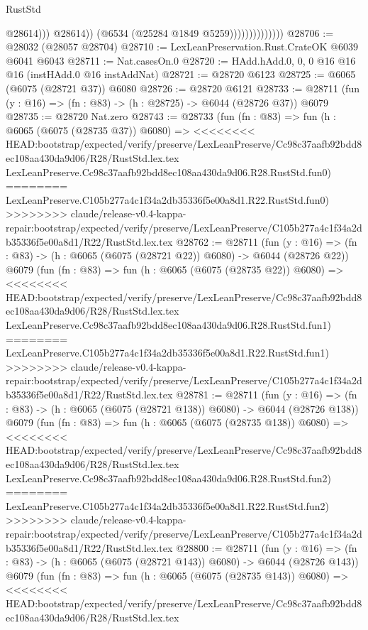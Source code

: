 \begin{lexlean}{RustStd}
\begin{coremodule}
{\begin{coremodule}
{{{{{{{{{{{{{{{{{{{{{{{{{{                                      @28614)))
                                @28614))
                            (@6534 (@25284 @1849 @5259))))))))))))))
@28706 := @28032 (@28057 @28704)
@28710 := LexLeanPreservation.Rust.CrateOK @6039 @6041 @6043
@28711 := Nat.casesOn.{0}
@28720 := HAdd.hAdd.{0, 0, 0} @16 @16 @16 (instHAdd.{0} @16 instAddNat)
@28721 := @28720 @6123
@28725 := @6065 (@6075 (@28721 @37)) @6080
@28726 := @28720 @6121
@28733 := @28711 (fun (y : @16) => (fn : @83) -> (h : @28725) -> @6044 (@28726 @37)) @6079
@28735 := @28720 Nat.zero
@28743 := @28733
    (fun (fn : @83) =>
    fun (h : @6065 (@6075 (@28735 @37)) @6080) =>
<<<<<<<< HEAD:bootstrap/expected/verify/preserve/LexLeanPreserve/Cc98c37aafb92bdd8ec108aa430da9d06/R28/RustStd.lex.tex
    LexLeanPreserve.Cc98c37aafb92bdd8ec108aa430da9d06.R28.RustStd.fun0)
========
    LexLeanPreserve.C105b277a4c1f34a2db35336f5e00a8d1.R22.RustStd.fun0)
>>>>>>>> claude/release-v0.4-kappa-repair:bootstrap/expected/verify/preserve/LexLeanPreserve/C105b277a4c1f34a2db35336f5e00a8d1/R22/RustStd.lex.tex
@28762 := @28711
    (fun (y : @16) => (fn : @83) -> (h : @6065 (@6075 (@28721 @22)) @6080) -> @6044 (@28726 @22))
    @6079
    (fun (fn : @83) =>
    fun (h : @6065 (@6075 (@28735 @22)) @6080) =>
<<<<<<<< HEAD:bootstrap/expected/verify/preserve/LexLeanPreserve/Cc98c37aafb92bdd8ec108aa430da9d06/R28/RustStd.lex.tex
    LexLeanPreserve.Cc98c37aafb92bdd8ec108aa430da9d06.R28.RustStd.fun1)
========
    LexLeanPreserve.C105b277a4c1f34a2db35336f5e00a8d1.R22.RustStd.fun1)
>>>>>>>> claude/release-v0.4-kappa-repair:bootstrap/expected/verify/preserve/LexLeanPreserve/C105b277a4c1f34a2db35336f5e00a8d1/R22/RustStd.lex.tex
@28781 := @28711
    (fun (y : @16) => (fn : @83) -> (h : @6065 (@6075 (@28721 @138)) @6080) -> @6044 (@28726 @138))
    @6079
    (fun (fn : @83) =>
    fun (h : @6065 (@6075 (@28735 @138)) @6080) =>
<<<<<<<< HEAD:bootstrap/expected/verify/preserve/LexLeanPreserve/Cc98c37aafb92bdd8ec108aa430da9d06/R28/RustStd.lex.tex
    LexLeanPreserve.Cc98c37aafb92bdd8ec108aa430da9d06.R28.RustStd.fun2)
========
    LexLeanPreserve.C105b277a4c1f34a2db35336f5e00a8d1.R22.RustStd.fun2)
>>>>>>>> claude/release-v0.4-kappa-repair:bootstrap/expected/verify/preserve/LexLeanPreserve/C105b277a4c1f34a2db35336f5e00a8d1/R22/RustStd.lex.tex
@28800 := @28711
    (fun (y : @16) => (fn : @83) -> (h : @6065 (@6075 (@28721 @143)) @6080) -> @6044 (@28726 @143))
    @6079
    (fun (fn : @83) =>
    fun (h : @6065 (@6075 (@28735 @143)) @6080) =>
<<<<<<<< HEAD:bootstrap/expected/verify/preserve/LexLeanPreserve/Cc98c37aafb92bdd8ec108aa430da9d06/R28/RustStd.lex.tex
}}}}}}}}}}}}}}}}}}}}}}}}}}
\end{coremodule}}
\end{coremodule}
\end{lexlean}
